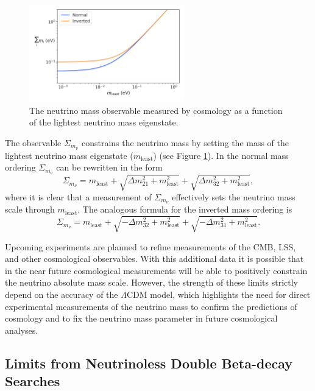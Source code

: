 \begin{figure}[htbp]
    \centering
    \includegraphics[width=0.6\textwidth]{figs/Chapter-2/230301_cosmology_nu_mass_observable.png}
    \caption{The neutrino mass observable measured by cosmology as a function of the lightest neutrino mass eigenstate.}
    \label{fig:chap2-nu-mass-cosmo}
\end{figure}

The observable $\Sigma_{m_\nu}$ constrains the neutrino mass by setting the mass of the lightest neutrino mass eigenstate ($m_\mathrm{least}$) (see Figure \ref{fig:chap2-nu-mass-cosmo}). In the normal mass ordering $\Sigma_{m_\nu}$ can be rewritten in the form 
\begin{equation}
    \Sigma_{m_\nu} = m_\mathrm{least} + \sqrt{\Delta m_{21}^2+m_\mathrm{least}^2}+\sqrt{\Delta m_{32}^2+m_\mathrm{least}^2},
\end{equation}
where it is clear that a measurement of $\Sigma_{m_\nu}$ effectively sets the neutrino mass scale through $m_\mathrm{least}$. The analogous formula for the inverted mass ordering is 
\begin{equation}
    \Sigma_{m_\nu} = m_\mathrm{least}+\sqrt{-\Delta m_{32}^2+m_\mathrm{least}^2}+\sqrt{-\Delta m_{31}^2+m_\mathrm{least}^2}.
\end{equation}

Upcoming experiments \cite{cmb_s4} are planned to refine measurements of the CMB, LSS, and other cosmological observables. With this additional data it is possible that in the near future cosmological measurements will be able to positively constrain the neutrino absolute mass scale. However, the strength of these limits strictly depend on the accuracy of the $\Lambda$CDM model, which highlights the need for direct experimental measurements of the neutrino mass to confirm the predictions of cosmology and to fix the neutrino mass parameter in future cosmological analyses.

\subsection{Limits from Neutrinoless Double Beta-decay Searches}

